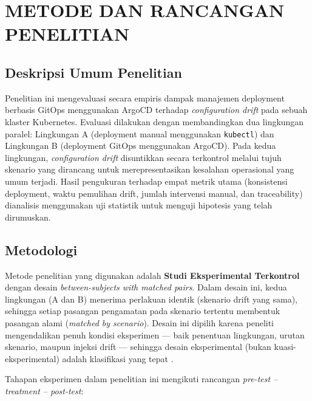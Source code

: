 \chapter{METODE DAN RANCANGAN PENELITIAN}

\section{Deskripsi Umum Penelitian}

Penelitian ini mengevaluasi secara empiris dampak manajemen deployment berbasis GitOps menggunakan ArgoCD terhadap \textit{configuration drift} pada sebuah klaster Kubernetes. Evaluasi dilakukan dengan membandingkan dua lingkungan paralel: Lingkungan A (deployment manual menggunakan \texttt{kubectl}) dan Lingkungan B (deployment GitOps menggunakan ArgoCD). Pada kedua lingkungan, \textit{configuration drift} disuntikkan secara terkontrol melalui tujuh skenario yang dirancang untuk merepresentasikan kesalahan operasional yang umum terjadi. Hasil pengukuran terhadap empat metrik utama (konsistensi deployment, waktu pemulihan drift, jumlah intervensi manual, dan traceability) dianalisis menggunakan uji statistik untuk menguji hipotesis yang telah dirumuskan.

\section{Metodologi}

Metode penelitian yang digunakan adalah \textbf{Studi Eksperimental Terkontrol} dengan desain \textit{between-subjects with matched pairs}. Dalam desain ini, kedua lingkungan (A dan B) menerima perlakuan identik (skenario drift yang sama), sehingga setiap pasangan pengamatan pada skenario tertentu membentuk pasangan alami (\textit{matched by scenario}). Desain ini dipilih karena peneliti mengendalikan penuh kondisi eksperimen --- baik penentuan lingkungan, urutan skenario, maupun injeksi drift --- sehingga desain eksperimental (bukan kuasi-eksperimental) adalah klasifikasi yang tepat \citep{wohlin2012experimentation}.

Tahapan eksperimen dalam penelitian ini mengikuti rancangan \textit{pre-test -- treatment -- post-test}:


